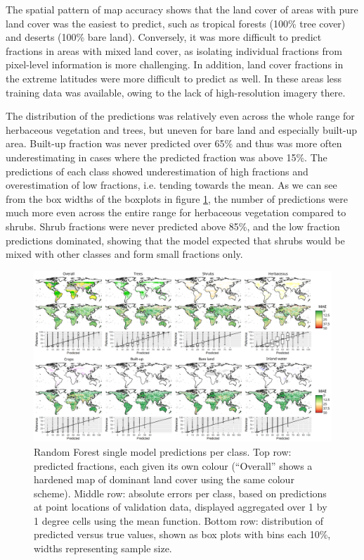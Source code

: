 \documentclass[review,authoryear,3p]{elsarticle}
\begin{document}
The spatial pattern of map accuracy shows that the land cover of areas with pure land cover was the easiest to predict, such as tropical forests (100\% tree cover) and deserts (100\% bare land).
Conversely, it was more difficult to predict fractions in areas with mixed land cover, as isolating individual fractions from pixel-level information is more challenging.
In addition, land cover fractions in the extreme latitudes were more difficult to predict as well.
In these areas less training data was available, owing to the lack of high-resolution imagery there.

The distribution of the predictions was relatively even across the whole range for herbaceous vegetation and trees, but uneven for bare land and especially built-up area.
Built-up fraction was never predicted over 65\% and thus was more often underestimating in cases where the predicted fraction was above 15\%.
The predictions of each class showed underestimation of high fractions and overestimation of low fractions, i.e. tending towards the mean.
As we can see from the box widths of the boxplots in figure \ref{fig-walltowall}, the number of predictions were much more even across the entire range for herbaceous vegetation compared to shrubs.
Shrub fractions were never predicted above 85\%, and the low fraction predictions dominated, showing that the model expected that shrubs would be mixed with other classes and form small fractions only.

\begin{figure}
    \centering
    \includegraphics[width=\textwidth]{article/article-figures/maps/2020-07-29-walltowall.png}
    \caption{Random Forest single model predictions per class. Top row: predicted fractions, each given its own colour (``Overall'' shows a hardened map of dominant land cover using the same colour scheme). Middle row: absolute errors per class, based on predictions at point locations of validation data, displayed aggregated over 1 by 1 degree cells using the mean function. Bottom row: distribution of predicted versus true values, shown as box plots with bins each 10\%, widths representing sample size.}
    \label{fig-walltowall}
\end{figure}
\end{document}
